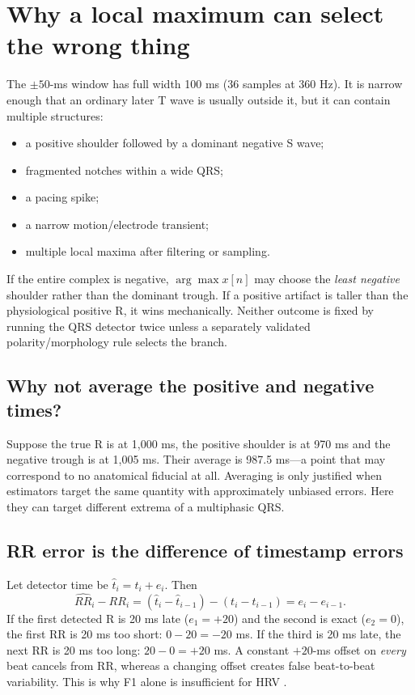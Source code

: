 \documentclass[11pt]{article}
\begin{document}
\clearpage
\section{Why a local maximum can select the wrong thing}
The \(\pm50\)-ms window has full width 100 ms (36 samples at 360 Hz).  It is narrow enough that an ordinary later T wave is usually outside it, but it can contain multiple structures:
\begin{itemize}
\item a positive shoulder followed by a dominant negative S wave;
\item fragmented notches within a wide QRS;
\item a pacing spike;
\item a narrow motion/electrode transient;
\item multiple local maxima after filtering or sampling.
\end{itemize}
If the entire complex is negative, \(\arg\max x[n]\) may choose the \emph{least negative} shoulder rather than the dominant trough.  If a positive artifact is taller than the physiological positive R, it wins mechanically.  Neither outcome is fixed by running the QRS detector twice unless a separately validated polarity/morphology rule selects the branch.

\subsection{Why not average the positive and negative times?}
Suppose the true R is at 1,000 ms, the positive shoulder is at 970 ms and the negative trough is at 1,005 ms.  Their average is 987.5 ms---a point that may correspond to no anatomical fiducial at all.  Averaging is only justified when estimators target the same quantity with approximately unbiased errors.  Here they can target different extrema of a multiphasic QRS.

\subsection{RR error is the difference of timestamp errors}
Let detector time be \(\hat t_i=t_i+e_i\). Then
\[
\widehat{RR}_i-RR_i=(\hat t_i-\hat t_{i-1})-(t_i-t_{i-1})=e_i-e_{i-1}.
\]
If the first detected R is 20 ms late (\(e_1=+20\)) and the second is exact (\(e_2=0\)), the first RR is 20 ms too short: \(0-20=-20\) ms.  If the third is 20 ms late, the next RR is 20 ms too long: \(20-0=+20\) ms.  A constant \(+20\)-ms offset on \emph{every} beat cancels from RR, whereas a changing offset creates false beat-to-beat variability.  This is why F1 alone is insufficient for HRV \cite{porr2024jitter,reklewski2026noise}.
\end{document}
